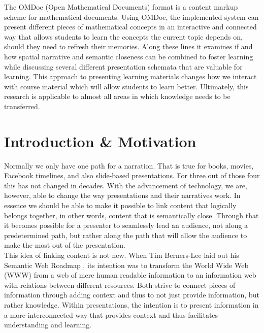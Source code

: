 \documentclass[twoside, 12pt]{article}
\begin{document}
The OMDoc (Open Mathematical Documents) format \cite{Kohlhase:OMDoc1.2} is a content markup scheme for mathematical documents. Using OMDoc, the implemented system can present different pieces of mathematical concepts in an interactive and connected way that allows students to learn the concepts the current topic depends on, should they need to refresh their memories. Along these lines it examines if and how spatial narrative and semantic closeness can be combined to foster learning while discussing several different presentation schemata that are valuable for learning. This approach to presenting learning materials changes how we interact with course material which will allow students to learn better. Ultimately, this research is applicable to almost all areas in which knowledge needs to be transferred.\\ 

\newpage
\tableofcontents

\clearpage
{}

\section{Introduction \& Motivation}
\label{sec:introduction}

Normally we only have one path for a narration. That is true for books, movies, Facebook timelines, and also slide-based presentations. For three out of those four this has not changed in decades. With the advancement of technology, we are, however, able to change the way presentations and their narratives work. In essence we should be able to make it possible to link content that logically belongs together, in other words, content that is semantically close. Through that it becomes possible for a presenter to seamlessly lead an audience, not along a predetermined path, but rather along the path that will allow the audience to make the most out of the presentation.\\

This idea of linking content is not new. When Tim Berners-Lee laid out his Semantic Web Roadmap \cite{BernersLee:tsw98}, its intention was to transform the World Wide Web (WWW) from a web of mere human readable information to an information web with relations between different resources. Both strive to connect pieces of information through adding context and thus to not just provide information, but rather knowledge. Within presentations, the intention is to present information in a more interconnected way that provides context and thus facilitates understanding and learning. \\
\end{document}
